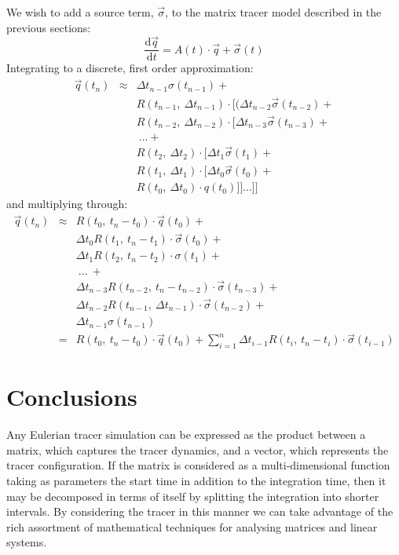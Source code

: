 \documentclass[11pt]{article}
\begin{document}
We wish to add a source term, $\vec \sigma$, to the matrix tracer model
described in the previous sections:
\begin{equation}
\frac{\mathrm d \vec q}{\mathrm d t} = A(t) \cdot \vec q + \vec \sigma(t)
\end{equation}
Integrating to a discrete, first order approximation:
\begin{eqnarray}
  \vec q(t_n) 
  & \approx & \Delta t_{n-1} \sigma(t_{n-1}) + \nonumber \\
  & & R(t_{n-1}, ~ \Delta t_{n-1}) \cdot [(\Delta t_{n-2} \vec \sigma(t_{n-2}) + \nonumber \\
  & & R(t_{n-2}, ~ \Delta t_{n-2}) \cdot [\Delta t_{n-3} \vec \sigma(t_{n-3}) + \nonumber \\
  & & ~... + \nonumber \\
  & & R(t_2, ~ \Delta t_2) \cdot [\Delta t_1 \vec \sigma(t_1) + \nonumber \\
  & & R(t_1, ~ \Delta t_1) \cdot [\Delta t_0 \vec \sigma(t_0) + \nonumber \\
  & & R(t_0, ~ \Delta t_0) \cdot q(t_0) ]]...]]
\end{eqnarray}
and multiplying through:
\begin{eqnarray}
\vec q(t_n) 
  & \approx & R(t_0, ~ t_n-t_0) \cdot \vec q(t_0) + \nonumber \\
  & & \Delta t_0 R(t_1, ~ t_n-t_1) \cdot \vec \sigma(t_0) + \nonumber \\
  & & \Delta t_1 R(t_2, ~ t_n-t_2) \cdot \sigma(t_1) + \nonumber \\
  & & ~...~+ \nonumber \\ 
  & & \Delta t_{n-3} R(t_{n-2}, ~ t_n-t_{n-2}) \cdot \vec\sigma(t_{n-3}) + \nonumber \\
  & & \Delta t_{n-2} R(t_{n-1}, ~ \Delta t_{n-1}) \cdot \vec \sigma(t_{n-2}) + \nonumber \\
  & & \Delta t_{n-1} \sigma(t_{n-1}) \\
  & = & R(t_0,~t_n-t_0) \cdot \vec q(t_0) + 
  \sum_{i=1}^{n} \Delta t_{i-1} R(t_i,~t_n-t_i) \cdot \vec \sigma(t_{i-1})
\end{eqnarray}

\section{Conclusions}

Any Eulerian tracer simulation can be expressed as the product between a matrix,
which captures the tracer dynamics, and a vector, which represents the tracer
configuration.  If the matrix is considered as a multi-dimensional function
taking as parameters the start time 
in addition to the integration time, then it may be decomposed in terms of
itself by splitting the integration into shorter intervals.  
By considering the tracer in this manner we can take advantage of the rich
assortment of mathematical techniques for analysing matrices and linear systems.
\end{document}
